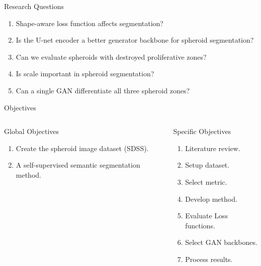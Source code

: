 \begin{frame}{Research Questions}
        \begin{enumerate}
            \item Shape-aware \alert{loss function affects} segmentation?
            \item Is the U-net encoder a \alert{better generator backbone} for spheroid segmentation?
            \item Can we evaluate spheroids with \alert{destroyed proliferative zones}?
            \item Is \alert{scale} important in spheroid segmentation?
            \item Can a single GAN \alert{differentiate all three spheroid zones}?
        \end{enumerate}
\end{frame}


\begin{frame}{Objectives}
    \begin{columns}
            \begin{block}{Global Objectives}
                \begin{enumerate}
                    \item Create the spheroid image dataset (SDSS).
                    \item A self-supervised semantic segmentation method.
                \end{enumerate}
            \end{block}
            \begin{block}{Specific Objectives}
                \begin{enumerate}
                    \item Literature review.
                    \item Setup dataset.
                    \item Select metric.
                    \item Develop method.
                    \item Evaluate Loss functions.
                    \item Select GAN backbones.
                    \item Process results.
                \end{enumerate}
            \end{block}
    \end{columns}
\end{frame}

